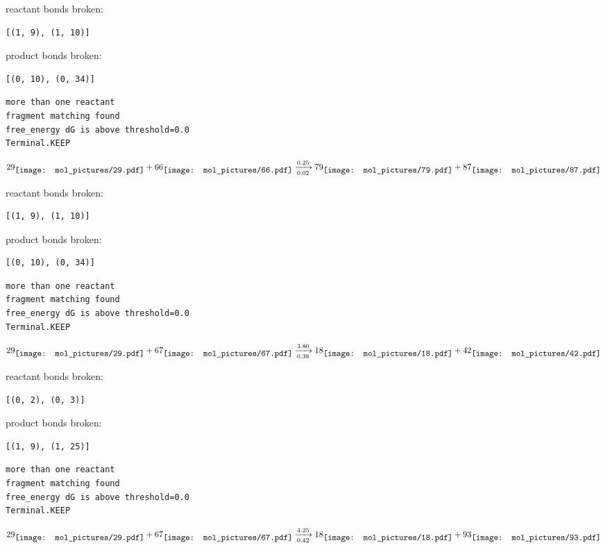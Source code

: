\documentclass{article}
\begin{document}
reactant bonds broken:\begin{verbatim}
[(1, 9), (1, 10)]
\end{verbatim}
product bonds broken:\begin{verbatim}
[(0, 10), (0, 34)]
\end{verbatim}




\vspace{1cm}
\begin{verbatim}
more than one reactant
fragment matching found
free_energy dG is above threshold=0.0
Terminal.KEEP
\end{verbatim}
$$
29
\raisebox{-.5\height}{\texttt{[image: mol\_pictures/29.pdf]}}
+
66
\raisebox{-.5\height}{\texttt{[image: mol\_pictures/66.pdf]}}
\xrightarrow[0.02]{0.25}
79
\raisebox{-.5\height}{\texttt{[image: mol\_pictures/79.pdf]}}
+
87
\raisebox{-.5\height}{\texttt{[image: mol\_pictures/87.pdf]}}
$$


reactant bonds broken:\begin{verbatim}
[(1, 9), (1, 10)]
\end{verbatim}
product bonds broken:\begin{verbatim}
[(0, 10), (0, 34)]
\end{verbatim}




\vspace{1cm}
\begin{verbatim}
more than one reactant
fragment matching found
free_energy dG is above threshold=0.0
Terminal.KEEP
\end{verbatim}
$$
29
\raisebox{-.5\height}{\texttt{[image: mol\_pictures/29.pdf]}}
+
67
\raisebox{-.5\height}{\texttt{[image: mol\_pictures/67.pdf]}}
\xrightarrow[0.38]{3.80}
18
\raisebox{-.5\height}{\texttt{[image: mol\_pictures/18.pdf]}}
+
42
\raisebox{-.5\height}{\texttt{[image: mol\_pictures/42.pdf]}}
$$


reactant bonds broken:\begin{verbatim}
[(0, 2), (0, 3)]
\end{verbatim}
product bonds broken:\begin{verbatim}
[(1, 9), (1, 25)]
\end{verbatim}




\vspace{1cm}
\begin{verbatim}
more than one reactant
fragment matching found
free_energy dG is above threshold=0.0
Terminal.KEEP
\end{verbatim}
$$
29
\raisebox{-.5\height}{\texttt{[image: mol\_pictures/29.pdf]}}
+
67
\raisebox{-.5\height}{\texttt{[image: mol\_pictures/67.pdf]}}
\xrightarrow[0.42]{4.25}
18
\raisebox{-.5\height}{\texttt{[image: mol\_pictures/18.pdf]}}
+
93
\raisebox{-.5\height}{\texttt{[image: mol\_pictures/93.pdf]}}
$$
\end{document}

